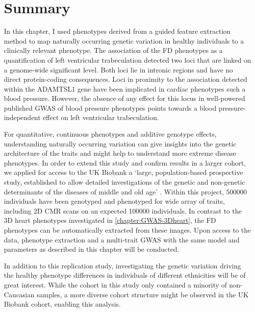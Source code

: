 \section{Summary}
In this chapter, I used phenotypes derived from a guided feature extraction method to map naturally occurring genetic variation in healthy individuals to a clinically relevant phenotype. The association of the FD phenotypes as a quantification of left ventricular trabeculation detected two loci that are linked on a genome-wide significant level. Both loci lie in intronic regions and have no direct protein-coding consequences. Loci in proximity to the association detected within the ADAMTSL1 gene have been implicated in cardiac phenotypes such a blood pressure. However, the absence of any effect for this locus in well-powered published GWAS of blood pressure phenotypes points towards a blood pressure-independent effect on left ventricular trabeculation.

For quantitative, continuous phenotypes and additive genotype effects, understanding naturally occurring variation can give insights into the genetic architecture of the traits and might help to understand more extreme disease phenotypes. In order to extend this study and confirm results in a larger cohort, we applied for access to the UK Biobank a `large, population-based prospective study, established to allow detailed investigations of the genetic and non-genetic determinants of the diseases of middle and old age' \citep{Sudlow2015}. Within this project, \num{500000} individuals have been genotyped and phenotyped for wide array of traits, including 2D CMR scans on an expected \num{100000} individuals. In contrast to the 3D heart phenotypes investigated in \cref{chapter:GWAS-3Dheart}, the FD phenotypes can be automatically extracted from these images. Upon access to the data,  phenotype extraction and a multi-trait GWAS with the same model and parameters as described in this chapter will be conducted. 

In addition to this replication study, investigating the genetic variation driving the healthy phenotype differences in individuals of different ethnicities \citep{Kawel2012,Captur2014} will be of great interest. While the cohort in this study only contained a minority of non-Caucasian samples, a more diverse cohort structure might be observed in the UK Biobank cohort, enabling this analysis. 

